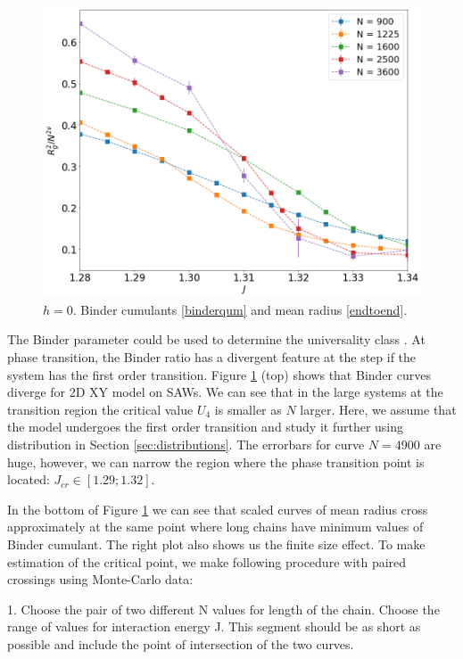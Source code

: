 \begin{figure}[H]
 	\includegraphics[scale=0.23]{Images/rscaling_longchains.png} 	
 	
 	\caption{$h=0$. Binder  cumulants \eqref{binderqum} and mean radius \eqref{endtoend}.  }
 	\label{fig:bcshort}
 \end{figure}

The Binder parameter  could be used to determine the universality class \cite{binder1981finite}.  At phase transition, the Binder ratio  has a divergent feature at the step if the system has the first order transition. Figure \ref{fig:bcshort}  (top) shows that Binder curves diverge for 2D XY model on SAWs. We can see that in the large systems at the transition region the critical value $ U_4  $ is smaller as $N$ larger. Here, we assume that the model undergoes  the first order transition and study it further using distribution in Section \ref{sec:distributions}. The errorbars for curve $N=4900$ are huge, however, we can narrow the region where the phase transition point is located: $J_{cr} \in [1.29; 1.32]$. 

In the bottom of Figure \ref{fig:bcshort} we can see that scaled curves of mean radius cross approximately at the same point where long chains have minimum values of Binder cumulant. The right plot also shows us the finite size effect. To make estimation of the critical point, we make following procedure with paired crossings using Monte-Carlo data: 

1. Choose the pair of two different N values for length of the chain. Choose the range of values for interaction energy J. This segment should be as short as possible and include the point of intersection of the two curves. 

